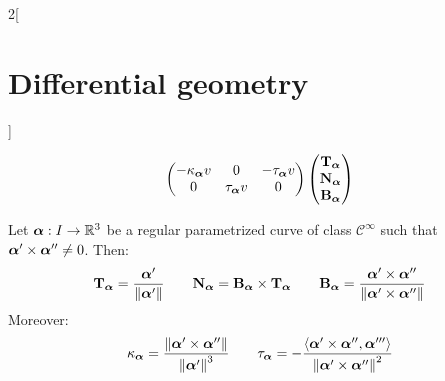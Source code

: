\documentclass[../../../main.tex]{subfiles}
\begin{document}
\begin{multicols}{2}[\section{Differential geometry}]
\begin{theorem}
$$\begin{pmatrix}
        -\ka\alpha v & 0           & -\ta\alpha v \\
        0            & \ta\alpha v & 0
      \end{pmatrix}
      \begin{pmatrix}
        \T\alpha \\
        \N\alpha \\
        \B\alpha \\
      \end{pmatrix}
    $$
  \end{theorem}
  \begin{corollary}
    Let $\vf{\alpha}:I\rightarrow\RR^3$ be a regular parametrized curve of class $\mathcal{C}^\infty$ such that $\vf{\alpha}'\times \vf{\alpha}''\ne 0$. Then:
    $$\T\alpha=\frac{\vf{\alpha}'}{\|\vf{\alpha}'\|}\qquad\N\alpha=\B\alpha\times\T\alpha\qquad\B\alpha=\frac{\vf{\alpha}'\times\vf{\alpha}''}{\|\vf{\alpha}'\times\vf{\alpha}''\|}$$
    Moreover: $$\ka\alpha=\frac{\|\vf{\alpha}'\times\vf{\alpha}''\|}{{\|\vf{\alpha}'\|}^3}\qquad\ta\alpha=-\frac{\langle\vf{\alpha}'\times\vf{\alpha}'',\vf{\alpha}'''\rangle}{{\|\vf{\alpha}'\times\vf{\alpha}''\|}^2}$$
  \end{corollary}

\end{multicols}
\end{document}
